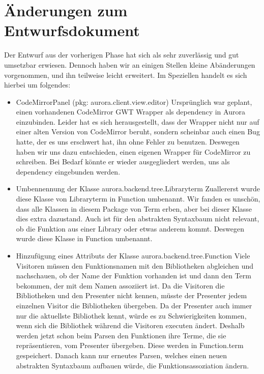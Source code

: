\documentclass[parskip=full,11pt,twoside]{scrartcl}
\begin{document}
\section{Änderungen zum Entwurfsdokument}
Der Entwurf aus der vorherigen Phase hat sich als sehr zuverlässig und gut umsetzbar erwiesen.
Dennoch haben wir an einigen Stellen kleine Abänderungen vorgenommen, und ihn teilweise leicht erweitert.
Im Speziellen handelt es sich hierbei um folgendes:
\begin{itemize}
    \item CodeMirrorPanel (pkg: aurora.client.view.editor)
    \newline
    Ursprünglich war geplant, einen vorhandenen CodeMirror GWT Wrapper als dependency in Aurora einzubinden.
    Leider hat es sich herausgestellt, dass der Wrapper nicht nur auf einer alten Version von CodeMirror beruht, sondern scheinbar auch einen Bug hatte, der es uns erschwert hat, ihn ohne Fehler zu benutzen.
    Deswegen haben wir uns dazu entschieden, einen eigenen Wrapper für CodeMirror zu schreiben.
    Bei Bedarf könnte er wieder ausgegliedert werden, uns als dependency eingebunden werden.

	\item Umbennennung der Klasse aurora.backend.tree.Libraryterm
	\newline
	Zuallererst wurde diese Klasse von Libraryterm in Function umbenannt. Wir fanden es unschön, dass alle Klassen in
	diesem Package von Term erben, aber bei dieser Klasse dies extra dazustand. Auch ist für den abstrakten Syntaxbaum
	nicht relevant, ob die Funktion aus einer Library oder etwas anderem kommt. Deswegen wurde diese Klasse in Function
	umbenannt.

	\item Hinzufügung eines Attributs der Klasse aurora.backend.tree.Function
	\newline
	Viele Visitoren müssen den Funktionsnamen mit den Bibliotheken abgleichen und nachschauen, ob der Name der Funktion
	vorhanden ist und dann den Term bekommen, der mit dem Namen assoziiert ist. Da die Visitoren die Bibliotheken und
	den Presenter nicht kennen, müsste der 	Presenter jedem einzelnen Visitor die Bibliotheken übergeben. Da der
	Presenter auch immer nur die aktuellste Bibliothek kennt, würde es zu Schwierigkeiten kommen, wenn sich die
	Bibliothek während die Visitoren executen ändert.
	Deshalb werden jetzt schon beim Parsen den Funktionen ihre Terme, die sie repräsentieren, vom Presenter übergeben.
	Diese werden in Function.term gespeichert. Danach kann nur erneutes Parsen, welches einen neuen abstrakten
	Syntaxbaum aufbauen würde, die Funktionsassoziation ändern.


\end{itemize}
\end{document}

